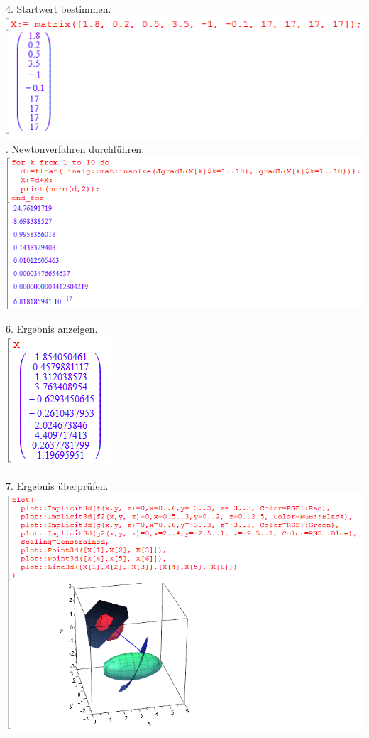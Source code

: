 \documentclass[11pt,final]{scrreprt}
\begin{document}
4. Startwert bestimmen.\\

\includegraphics[scale=2.2]{images/abstandsproblem3/start.png}
. Newtonverfahren durchführen.\\

\includegraphics[scale=2.2]{images/abstandsproblem3/newton.png}

6. Ergebnis anzeigen.\\

\includegraphics[scale=2.2]{images/abstandsproblem3/result.png}

7. Ergebnis überprüfen.\\

\includegraphics[scale=2.2]{images/abstandsproblem3/plot.png}
\end{document}
